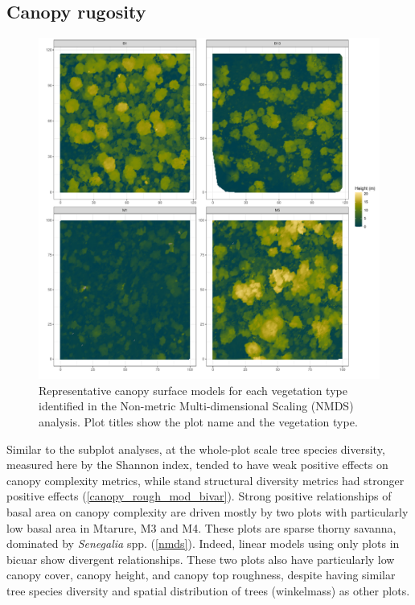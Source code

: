 \documentclass[11pt,a4paper]{article}
\begin{document}
%

\subsection{Canopy rugosity}

\begin{figure}[H]
	\includegraphics[width=\textwidth]{veg_type_tile}
	\caption{Representative canopy surface models for each vegetation type identified in the Non-metric Multi-dimensional Scaling (NMDS) analysis. Plot titles show the plot name and the vegetation type.}
	\label{veg_type_tile}
\end{figure}

Similar to the subplot analyses, at the whole-plot scale tree species diversity, measured here by the Shannon index, tended to have weak positive effects on canopy complexity metrics, while stand structural diversity metrics had stronger positive effects (\autoref{canopy_rough_mod_bivar}). Strong positive relationships of basal area on canopy complexity are driven mostly by two plots with particularly low basal area in Mtarure, M3 and M4. These plots are sparse thorny savanna, dominated by \textit{Senegalia} spp. (\autoref{nmds}). Indeed, linear models using only plots in bicuar show divergent relationships. These two plots also have particularly low canopy cover, canopy height, and canopy top roughness, despite having similar tree species diversity and spatial distribution of trees (winkelmass) as other plots.
\end{document}
